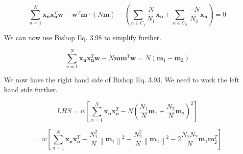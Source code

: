 \documentclass[12pt, letterpaper]{article}
\begin{document}
\begin{equation}
\sum_{n=1}^{N} \mathbf{x}_{\mathbf{n}} \mathbf{x}_{\mathbf{n}}^{T} \mathbf{w}-\mathbf{w}^{T} \mathbf{m} \cdot(N \mathbf{m})-\left(\sum_{n \in C_{1}} \frac{N}{N_{1}} \mathbf{x}_{\mathbf{n}}+\sum_{n \in C_{2}} \frac{-N}{N_{2}} \mathbf{x}_{\mathbf{n}}\right) = 0
\end{equation}

We can now use Bishop Eq. 3.98 to simplify further. 

\begin{equation}
\sum_{n=1}^{N} \mathbf{x}_{\mathbf{n}} \mathbf{x}_{\mathbf{n}}^{T} \mathbf{w}-N \mathbf{m m}^{T} \mathbf{w} = N\left(\mathbf{m}_{1}-\mathbf{m}_{2}\right)
\end{equation}

We now have the right hand side of Bishop Eq. 3.93. We need to work the left hand side further. 

\begin{equation}
LHS = w [\sum_{n=1}^{N} \mathbf{x}_{\mathbf{n}} \mathbf{x}_{\mathbf{n}}^{T}-N\left(\frac{N_{1}}{N} \mathbf{m}_{1}+\frac{N_{2}}{N} \mathbf{m}_{2}\right)^{2}]
\end{equation}

\begin{equation}
=w [\sum_{n=1}^{N} \mathbf{x}_{\mathbf{n}} \mathbf{x}_{\mathbf{n}}^{T}-\frac{N_{1}^{2}}{N}\left\|\mathbf{m}_{1}\right\|^{2}-\frac{N_{2}^{2}}{N}\left\|\mathbf{m}_{2}\right\|^{2}-2 \frac{N_{1} N_{2}}{N} \mathbf{m}_{1} \mathbf{m}_{2}^{T}]
\end{equation}
\end{document}
